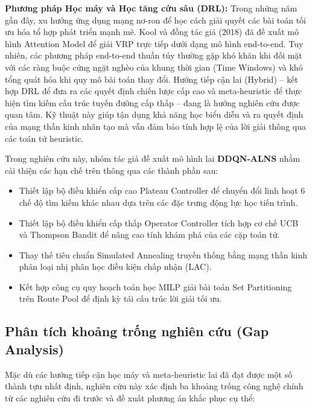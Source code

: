 \documentclass[13pt,a4paper]{extarticle}
\begin{document}
\textbf{Phương pháp Học máy và Học tăng cứu sâu (DRL):} Trong những năm gần đây, xu hướng ứng dụng mạng nơ-ron để học cách giải quyết các bài toán tối ưu hóa tổ hợp phát triển mạnh mẽ. Kool và đồng tác giả (2018) \cite{kool2018} đã đề xuất mô hình Attention Model để giải VRP trực tiếp dưới dạng mô hình end-to-end. Tuy nhiên, các phương pháp end-to-end thuần túy thường gặp khó khăn khi đối mặt với các ràng buộc cứng ngặt nghèo của khung thời gian (Time Windows) và khó tổng quát hóa khi quy mô bài toán thay đổi. Hướng tiếp cận lai (Hybrid) -- kết hợp DRL để đưa ra các quyết định chiến lược cấp cao và meta-heuristic để thực hiện tìm kiếm cấu trúc tuyến đường cấp thấp -- đang là hướng nghiên cứu được quan tâm. Kỹ thuật này giúp tận dụng khả năng học biểu diễn và ra quyết định của mạng thần kinh nhân tạo mà vẫn đảm bảo tính hợp lệ của lời giải thông qua các toán tử heuristic.

Trong nghiên cứu này, nhóm tác giả đề xuất mô hình lai \textbf{DDQN-ALNS} nhằm cải thiện các hạn chế trên thông qua các thành phần sau:
\begin{itemize}[leftmargin=1.2cm]
  \item Thiết lập bộ điều khiển cấp cao Plateau Controller để chuyển đổi linh hoạt 6 chế độ tìm kiếm khác nhau dựa trên các đặc trưng động lực học tiến trình.
  \item Thiết lập bộ điều khiển cấp thấp Operator Controller tích hợp cơ chế UCB và Thompson Bandit để nâng cao tính khám phá của các cặp toán tử.
  \item Thay thế tiêu chuẩn Simulated Annealing truyền thống bằng mạng thần kinh phân loại nhị phân học điều kiện chấp nhận (LAC).
  \item Kết hợp công cụ quy hoạch toán học MILP giải bài toán Set Partitioning trên Route Pool để định kỳ tái cấu trúc lời giải tối ưu.
\end{itemize}

\subsection{Phân tích khoảng trống nghiên cứu (Gap Analysis)}

Mặc dù các hướng tiếp cận học máy và meta-heuristic lai đã đạt được một số thành tựu nhất định, nghiên cứu này xác định ba khoảng trống công nghệ chính từ các nghiên cứu đi trước và đề xuất phương án khắc phục cụ thể:
\end{document}
